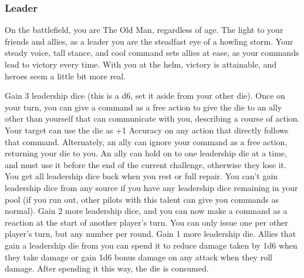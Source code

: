 \subsubsection{Leader}

\begin{talent}
{On the battlefield, you are The Old Man, regardless of age. The light to your friends and allies, as a leader you are the steadfast eye of a howling storm. Your steady voice, tall stance, and cool command sets allies at ease, as your commands lead to victory every time. With you at the helm, victory is attainable, and heroes seem a little bit more real.}

Gain 3 leadership dice (this is a d6, set it aside from your other die). Once on your turn, you can give a command as a free action to give the die to an ally other than yourself that can communicate with you, describing a course of action. Your target can use the die as +1 Accuracy on any action that directly follows that command. Alternately, an ally can ignore your command as a free action, returning your die to you. 
An ally can hold on to one leadership die at a time, and must use it before the end of the current challenge, otherwise they lose it. You get all leadership dice back when you rest or full repair. You can't gain leadership dice from any source if you have any leadership dice remaining in your pool (if you run out, other pilots with this talent can give you commands as normal). 
Gain 2 more leadership dice, and you can now make a command as a reaction at the start of another player's turn. You can only issue one per other player's turn, but any number per round. 
Gain 1 more leadership die. Allies that gain a leadership die from you can spend it to reduce damage taken by 1d6 when they take damage or gain 1d6 bonus damage on any attack when they roll damage. After spending it this way, the die is consumed.
\end{talent}
